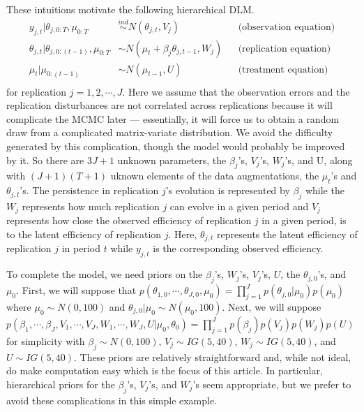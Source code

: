 \documentclass[graybox]{svmult}
\begin{document}
These intuitions motivate the following hierarchical DLM.
\begin{align*}
y_{j,t}|\theta_{j,0:T},\mu_{0:T}&\stackrel{ind}{\sim}N(\theta_{j,t},V_j)&&\mbox{(observation equation)}\\
\theta_{j,t}|\theta_{j,0:(t-1)},\mu_{0:T}&\sim N(\mu_{t} + \beta_j\theta_{j,t-1},W_j)&&\mbox{(replication equation)}\\
\mu_t|\mu_{0:(t-1)} &\sim N(\mu_{t-1},U)&&\mbox{(treatment equation)}\\
\end{align*}
for replication $j=1,2,\cdots,J$. Here we assume that the observation errors and the replication disturbances are not correlated across replications because it will complicate the MCMC later --- essentially, it will force us to obtain a random draw from a complicated matrix-variate distribution. We avoid the difficulty generated by this complication, though the model would probably be improved by it. So there are $3J + 1$ unknown parameters, the $\beta_j$'s, $V_j$'s, $W_j$'s, and U, along with $(J+1)(T+1)$ uknown elements of the data augmentations, the $\mu_t$'s and $\theta_{j,t}$'s. The persistence in replication $j$'s evolution is represented by $\beta_j$ while the $W_j$ represents how much replication $j$ can evolve in a given period and $V_j$ represents how close the observed efficiency of replication $j$ in a given period, is to the latent efficiency of replication $j$. Here, $\theta_{j,t}$ represents the latent efficiency of replication $j$ in period $t$ while $y_{j,t}$ is the corresponding observed efficiency.

To complete the model, we need priors on the $\beta_j$'s, $W_j$'s, $V_j$'s, $U$, the $\theta_{j,0}$'s, and $\mu_0$. First, we will suppose that $p(\theta_{1,0},\cdots,\theta_{J,0},\mu_0)=\prod_{j=1}^Jp(\theta_{j,0}|\mu_0)p(\mu_0)$ where $\mu_0\sim N(0,100)$ and $\theta_{j,0}|\mu_0\sim N(\mu_0, 100)$. Next, we will suppose $p(\beta_1,\cdots,\beta_J,V_1,\cdots,V_J,W_1,\cdots,W_J,U|\mu_0,\theta_0)=\prod_{j=1}^Jp(\beta_j)p(V_j)p(W_j)p(U)$ for simplicity with $\beta_j\sim N(0,100)$, $V_j\sim IG(5,40)$, $W_j\sim IG(5,40)$, and $U\sim IG(5,40)$. These priors are relatively straightforward and, while not ideal, do make computation easy which is the focus of this article. In particular, hierarchical priors for the $\beta_j$'s, $V_j$'s, and $W_j$'s seem appropriate, but we prefer to avoid these complications in this simple example.
\end{document}
